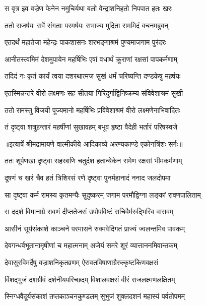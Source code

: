 \twolineshloka
{स वृत्र इव वज्रेण फेनेन नमुचिर्यथा}
{बलो वेन्द्राशनिहतो निपपात हतः खरः} %

\twolineshloka
{ततो राजर्षयः सर्वे संगताः परमर्षयः}
{सभाज्य मुदिता राममिदं वचनमब्रुवन्} %

\twolineshloka
{एतदर्थं महातेजा महेन्द्रः पाकशासनः}
{शरभङ्गाश्रमं पुण्यमाजगाम पुरंदरः} %

\twolineshloka
{आनीतस्त्वमिमं देशमुपायेन महर्षिभिः}
{एषां वधार्थं क्रूराणां रक्षसां पापकर्मणाम्} %

\twolineshloka
{तदिदं नः कृतं कार्यं त्वया दशरथात्मज}
{सुखं धर्मं चरिष्यन्ति दण्डकेषु महर्षयः} %

\twolineshloka
{एतस्मिन्नन्तरे वीरो लक्ष्मणः सह सीतया}
{गिरिदुर्गाद्विनिष्क्रम्य संविवेशाश्रमं सुखी} %

\twolineshloka
{ततो रामस्तु विजयी पूज्यमानो महर्षिभिः}
{प्रविवेशाश्रमं वीरो लक्ष्मणेनाभिवादितः} %

\twolineshloka
{तं दृष्ट्वा शत्रुहन्तारं महर्षीणां सुखावहम्}
{बभूव हृष्टा वैदेही भर्तारं परिषस्वजे} %


{॥इत्यार्षे श्रीमद्रामायणे वाल्मीकीये आदिकाव्ये अरण्यकाण्डे एकोनत्रिंशः सर्गः॥}


\twolineshloka
{ततः शूर्पणखा दृष्ट्वा सहस्राणि चतुर्दश}
{हतान्येकेन रामेण रक्षसां भीमकर्मणाम्} %

\twolineshloka
{दूषणं च खरं चैव हतं त्रिशिरसं रणे}
{दृष्ट्वा पुनर्महानादं ननाद जलदोपमा} %

\twolineshloka
{सा दृष्ट्वा कर्म रामस्य कृतमन्यैः सुदुष्करम्}
{जगाम परमौद्विग्ना लङ्कां रावणपालिताम्} %

\twolineshloka
{स ददर्श विमानाग्रे रावणं दीप्ततेजसं}
{उपोपविष्टं सचिवैर्मरुद्भिरिव वासवम्} %

\twolineshloka
{आसीनं सूर्यसंकाशे काञ्चने परमासने}
{रुक्मवेदिगतं प्राज्यं ज्वलन्तमिव पावकम्} %

\twolineshloka
{देवगन्धर्वभूतानामृषीणां च महात्मनाम्}
{अजेयं समरे शूरं व्यात्ताननमिवान्तकम्} %

\twolineshloka
{देवासुरविमर्देषु वज्राशनिकृतव्रणम्}
{ऐरावतविषाणाग्रैरुत्कृष्टकिणवक्षसं} %

\twolineshloka
{विंशद्भुजं दशग्रीवं दर्शनीयपरिच्छदम्}
{विशालवक्षसं वीरं राजलक्ष्मणलक्षितम्} %

\twolineshloka
{स्निग्धवैदूर्यसंकाशं तप्तकाञ्चनकुण्डलम्}
{सुभुजं शुक्लदशनं महास्यं पर्वतोपमम्} %

